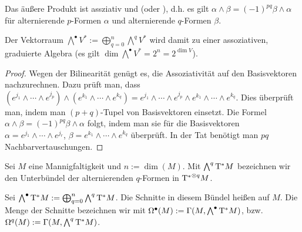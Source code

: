 \begin{st} \label{6.6}
    Das äußere Produkt ist assziativ und  (oder ), d.h. es gilt
    \begin{math}
        \alpha \wedge \beta = (-1)^{pq} \beta \wedge \alpha
    \end{math}
    für alternierende $p$-Formen $\alpha$ und alternierende $q$-Formen $\beta$.

    Der Vektorraum $\bigwedge^{\bullet} V^\ast := \bigoplus_{q=0}^n \bigwedge^q V^*$ wird damit zu einer assoziativen, graduierte Algebra (es gilt $\dim \bigwedge^\bullet V^\ast = 2^n = 2^{\dim V}$).
    \begin{proof}
        Wegen der Bilinearität genügt es, die Assoziativität auf den Basisvektoren nachzurechnen.
        Dazu prüft man, dass
        \begin{math}
            (e^{j_1} \wedge \dotsb \wedge e^{j_p}) \wedge (e^{k_1} \wedge \dotsb \wedge e^{k_q})
            = e^{j_1} \wedge \dotsb \wedge e^{j_p} \wedge e^{k_1} \wedge \dotsb \wedge e^{k_q}.
        \end{math}
        Dies überprüft man, indem man $(p+q)$-Tupel von Basisvektoren einsetzt.
        Die Formel $\alpha \wedge \beta = (-1)^{pq} \beta \wedge \alpha$ folgt, indem man sie für die Basisvektoren $\alpha = e^{j_1} \wedge \dotsb \wedge e^{j_r}$, $\beta = e^{k_1} \wedge \dotsb \wedge e^{k_q}$ überprüft.
        In der Tat benötigt man $pq$ Nachbarvertauschungen.
    \end{proof}
\end{st}

\begin{df} \label{6.7}
    Sei $M$ eine Mannigfaltigkeit und $n := \dim(M)$.
    Mit $\bigwedge^q \mathrm{T}^* M$ bezeichnen wir den Unterbündel der alternierenden $q$-Formen in ${\mathrm{T}^*}^{\otimes q} M$.

    Sei $\bigwedge^\bullet \mathrm{T}^* M := \bigoplus_{q=0}^n \bigwedge^q \mathrm{T}^* M$.
    Die Schnitte in diesem Bündel heißen  auf $M$.
    Die Menge der Schnitte bezeichnen wir mit $\Omega^\bullet(M) := \Gamma(M, \bigwedge^\bullet \mathrm{T}^* M)$, bzw. $\Omega^q(M) := \Gamma(M, \bigwedge^q \mathrm{T}^* M)$.
\end{df}

